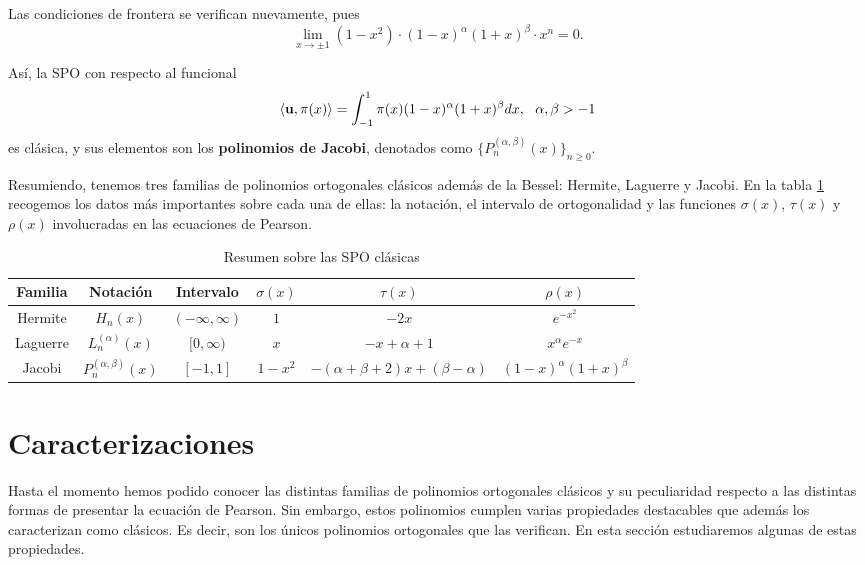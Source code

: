 Las condiciones de frontera se verifican nuevamente, pues $$\displaystyle\lim_{x\rightarrow \pm 1} (1-x^2)\cdot (1-x)^{\alpha}(1+x)^{\beta}\cdot x^n = 0.$$

Así, la SPO con respecto al funcional
\begin{equation}
    \label{eq:func-jacobi}
    \left\langle \mathbf{u} , \pi(x) \right\rangle = \int_{-1}^1 \pi(x)(1-x)^{\alpha}(1+x)^{\beta}dx, \ \ \alpha,\beta > -1
\end{equation}
es clásica, y sus elementos son los \textbf{polinomios de Jacobi}, denotados como $\{P_n^{(\alpha,\beta)}(x)\}_{n\geq 0}$.

Resumiendo, tenemos tres familias de polinomios ortogonales clásicos además de la Bessel: Hermite, Laguerre y Jacobi. En la tabla \ref{tab:SPO-clasicas} recogemos los datos más importantes sobre cada una de ellas: la notación, el intervalo de ortogonalidad y las funciones $\sigma(x)$, $\tau(x)$ y $\rho(x)$ involucradas en las ecuaciones de Pearson.

\begin{table}[h]
    \centering
    \begin{tabular}{cccccc}
    \hline
    \textbf{Familia} & \textbf{Notación}         & \textbf{Intervalo} & \textbf{$\sigma(x)$} & \textbf{$\tau(x)$}                  & \textbf{$\rho(x)$}            \\ \hline\hline
    Hermite                        & $H_n(x)$                 & $(-\infty,\infty)$ & $1$                  & $-2x$                               & $e^{-x^2}$                    \\ \hline
    Laguerre                       & $L_n^{(\alpha)}(x)$       & $[0,\infty)$       & $x$                  & $-x+\alpha+1$                       & $x^{\alpha} e^{-x}$           \\ \hline
    Jacobi                         & $P_n^{(\alpha,\beta)}(x)$ & $[-1,1]$           & $1-x^2$              & $-(\alpha+\beta+2)x+(\beta-\alpha)$ & $(1-x)^{\alpha}(1+x)^{\beta}$ \\ \hline
    \end{tabular}
    \caption{Resumen sobre las SPO clásicas}
    \label{tab:SPO-clasicas}
\end{table}

\section{Caracterizaciones}

Hasta el momento hemos podido conocer las distintas familias de polinomios ortogonales clásicos y su peculiaridad respecto a las distintas formas de presentar la ecuación de Pearson. Sin embargo, estos polinomios cumplen varias propiedades destacables que además los caracterizan como clásicos. Es decir, son los únicos polinomios ortogonales que las verifican. En esta sección estudiaremos algunas de estas propiedades.

